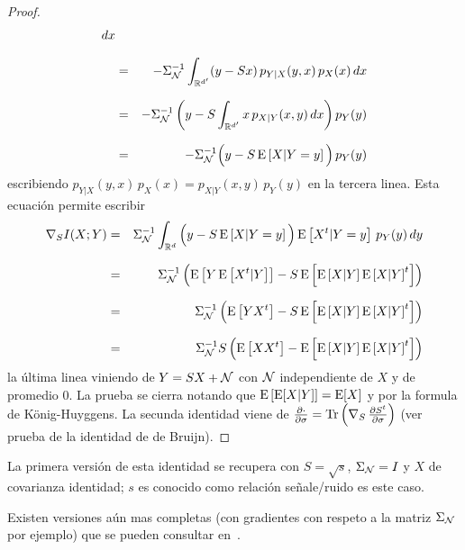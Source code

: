 \begin{proof}
\begin{eqnarray*}
  dx\\[2.5mm]
  & = & - \Sigma_{\mathcal{N}}^{-1} \int_{\mathbb{R}^{d'}} (y - S x) \, p_{Y|X}(y,x) \, p_X(x) \,
  dx\\[2.5mm]
  & = & - \Sigma_{\mathcal{N}}^{-1} \left( y - S \int_{\mathbb{R}^{d'}} x \, p_{X|Y}(x,y) \,dx
  \right) p_Y(y)\\[2.5mm]
  & = & - \Sigma_{\mathcal{N}}^{-1} \Big( y - S \operatorname{E}\left[X | Y=y \right] \Big) \, p_Y(y)
  \end{eqnarray*}
  escribiendo $p_{Y|X}(y,x)  \, p_X(x) =  p_{X|Y}(x,y) \, p_Y(y)$ en  la tercera
  linea. Esta ecuaci\'on permite escribir
  \begin{eqnarray*}
  \nabla_S I(X;Y) & = & \Sigma_{\mathcal{N}}^{-1} \int_{\mathbb{R}^d} \Big( y - S \operatorname{E}\left[X |
  Y=y \right] \Big) \operatorname{E}\left[X^t | Y=y \right] \, p_Y(y) \, dy\\[2.5mm]
  & = & \Sigma_{\mathcal{N}}^{-1} \left( \operatorname{E}\left[ Y \operatorname{E}\left[ X^t|Y \right] \right] - S
  \operatorname{E}\left[ \operatorname{E}\left[X | Y \right] \operatorname{E}\left[X | Y \right]^t \right]
  \right)\\[2.5mm]
  & = & \Sigma_{\mathcal{N}}^{-1} \left( \operatorname{E}\left[ Y X^t \right] - S \operatorname{E}\left[ \operatorname{E}\left[X
  | Y \right] \operatorname{E}\left[X | Y \right]^t \right] \right)\\[2.5mm]
  & = & \Sigma_{\mathcal{N}}^{-1} S \left( \operatorname{E}\left[ X X^t \right] - \operatorname{E}\left[
  \operatorname{E}\left[X | Y \right] \operatorname{E}\left[X | Y \right]^t \right] \right)
  \end{eqnarray*}
  la \'ultima linea viniendo de $Y = S X + \mathcal{N}$ con $\mathcal{N}$ independiente de
  $X$ y  de promedio 0.  La  prueba se cierra notando  que $\operatorname{E}\left[ \operatorname{E}[X|Y]
  \right] = \operatorname{E}[X]$ y por  la formula de K\"onig-Huyggens. La secunda identidad
  viene  de  $\frac{\partial \cdot}{\partial  \sigma}  =  \operatorname{Tr}\left( \nabla_S  \,
    \frac{\partial S^t}{\partial \sigma} \right)$ (ver prueba de la identidad de
  de Bruijn).
\end{proof}
%
\noindent La primera versi\'on de esta identidad se recupera con $S = \sqrt{s}$,
$\Sigma_{\mathcal{N}}  =  I$  y $X$  de  covarianza  identidad;  $s$ es  conocido  como
relaci\'on se\~nale/ruido es este caso.

Existen versiones  a\'un mas completas (con  gradientes con respeto  a la matriz
$\Sigma_{\mathcal{N}}$ por  ejemplo) que se pueden  consultar en~\cite{Joh04, PalVer06,
  PayPal09}.

\begin{figure}[h!]
%
\begin{center}  \end{center}
%
%
\label{fig:SZ:deBruijnVerdu}
\end{figure}
\

